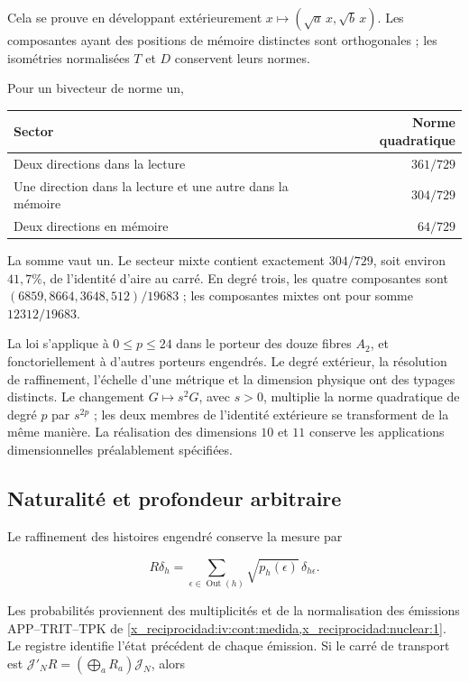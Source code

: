 Cela se prouve en développant extérieurement
\(x\mapsto(\sqrt a\,x,\sqrt b\,x)\).
Les composantes ayant des positions de mémoire distinctes sont
orthogonales ; les isométries normalisées \(T\) et \(D\)
conservent leurs normes.

Pour un bivecteur de norme un,

\begin{center}
\begin{tabular}{@{}lr@{}}
\toprule
Sector & Norme quadratique\\
\midrule
Deux directions dans la lecture & \(361/729\)\\
Une direction dans la lecture et une autre dans la mémoire & \(304/729\)\\
Deux directions en mémoire & \(64/729\)\\
\bottomrule
\end{tabular}
\end{center}

La somme vaut un. Le secteur mixte contient exactement \(304/729\),
soit environ \(41{,}7\%\), de l’identité d’aire au carré.
En degré trois, les quatre composantes sont
\((6859,8664,3648,512)/19683\) ; les composantes mixtes ont pour somme
\(12312/19683\).

La loi s’applique à \(0\le p\le24\) dans le porteur des douze
fibres \(A_2\), et fonctoriellement à d’autres porteurs engendrés.
Le degré extérieur, la résolution de raffinement, l’échelle d’une
métrique et la dimension physique ont des typages distincts.
Le changement \(G\mapsto s^2G\), avec \(s>0\), multiplie la norme
quadratique de degré \(p\) par \(s^{2p}\) ; les deux membres de
l’identité extérieure se transforment de la même manière.
La réalisation des dimensions \(10\) et \(11\) conserve les
applications dimensionnelles préalablement spécifiées.

\subsection{Naturalité et profondeur arbitraire}

Le raffinement des histoires engendré conserve la mesure par



\[
R\delta_h=\sum_{\epsilon\in\operatorname{Out}(h)}
\sqrt{p_h(\epsilon)}\,\delta_{h\epsilon}.
\]



Les probabilités proviennent des multiplicités et de la
normalisation des émissions APP--TRIT--TPK de
\cref{x_reciprocidad:iv:cont:medida,x_reciprocidad:nuclear:1}.
Le registre identifie l’état précédent de chaque émission.
Si le carré de transport est
\(\mathcal J'_NR=(\bigoplus_aR_a)\mathcal J_N\), alors



